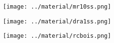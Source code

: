 \documentclass[aspectratio=169]{beamer}
\begin{document}
\begin{frame}
	\begin{center}
		\begin{figure}
			\texttt{[image: ../material/mr10ss.png]}
		\end{figure}
\end{center}

\end{frame}

\begin{frame}
	\begin{center}
		\begin{figure}
			\texttt{[image: ../material/dra1ss.png]}
		\end{figure}
	\end{center}

\end{frame}

\begin{frame}
	\begin{center}
		\begin{figure}
			\texttt{[image: ../material/rcbois.png]}
		\end{figure}
	\end{center}

\end{frame}
\end{document}
